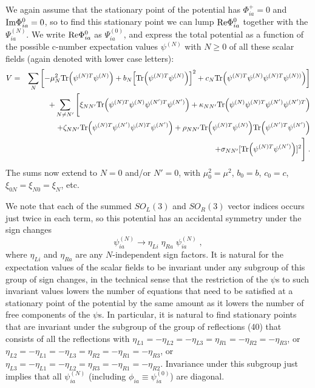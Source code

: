 We again assume that the stationary point of the potential has $\Phi^+_{ia}=0$ and ${\rm Im}\Phi^0_{ia}=0$, so to find this stationary point we can lump ${\rm Re}\Phi^0_{ia}$ together with the $\Psi^{(N)}_{ia}$.  We write ${\rm Re}\Phi^0_{ia}$ as $\Psi_{ia}^{(0)}$, and express the total potential as a function of the  possible c-number expectation values $\psi^{(N)}$ with $N\geq 0$ of all these  scalar fields (again denoted with lower case letters):
\begin{eqnarray}
V=&&\sum_N\left[-\mu_N^2{\rm Tr}\Big(\psi^{(N)T}\psi^{(N)}\Big)+b_N\Big[{\rm Tr}\Big(\psi^{(N)T}\psi^{(N)}\Big)\Big]^2+c_N{\rm Tr}\Big(\psi^{(N)T}\psi^{(N)}\psi^{(N)T}\psi^{(N))}\Big)\right]\nonumber\\&&
+\sum_{N\neq N'}\Bigg[\xi_{NN'} {\rm Tr}\Big(\psi^{(N)T}\psi^{(N)}\psi^{(N')T}\psi^{(N')}\Big)+\kappa_{N N'}{\rm Tr}\Big(\psi^{(N)}\psi^{(N)T}\psi^{(N')}\psi^{(N')T}\Big)\nonumber\\&&
+\zeta_{N N'} {\rm Tr}\Big(\psi^{(N)T}\psi^{(N')}\psi^{(N)T}\psi^{(N')}\Big)
+\rho_{N N'} {\rm Tr}\Big(\psi^{(N)T}\psi^{(N)}\Big){\rm Tr}\Big(\psi^{(N')T}\psi^{(N')}\Big)\nonumber\\&&+\sigma_{N N'} [{\rm Tr}\Big(\psi^{(N)T}\psi^{(N')}\Big)]^2\Bigg]\;.
\end{eqnarray}
The sums now extend to $N=0$ and/or $N'=0$, with $\mu_0^2=\mu^2$, $b_0=b$, $c_0=c$, $\xi_{0N}=\xi_{N0}=\xi_N$, etc.

We note that each of the summed $SO_L(3)$ and $SO_R(3)$ vector indices occurs just twice in each term, so this potential has an 
accidental symmetry under the sign changes
\begin{equation}
\psi^{(N)}_{ia}\rightarrow \eta_{Li}\;\eta_{Ra}\;\psi^{(N)}_{ia}\;,
\end{equation}
where $\eta_{Li}$ and $\eta_{Ra}$ are any $N$-independent sign factors.  It is natural for the expectation values of the scalar fields to be invariant under any subgroup of this group of sign changes, in the technical sense that the restriction of the $\psi$s to such invariant values lowers the number of equations that need to be satisfied at a stationary point of the potential by the same amount as it lowers the number of free components of the $\psi$s.  In particular, it is natural to find stationary points that are invariant under the subgroup of the group of reflections (40) that consists of all the reflections with $
\eta_{L1}=-\eta_{L2}=-\eta_{L3}=\eta_{R1}=-\eta_{R2}=-\eta_{R3}$, or $\eta_{L2}=-\eta_{L1}=-\eta_{L3}=\eta_{R2}=-\eta_{R1}=-\eta_{R3}$, or $\eta_{L3}=-\eta_{L1}=-\eta_{L2}=\eta_{R3}=-\eta_{R1}=-\eta_{R2}$.  Invariance under this subgroup just implies that all $\psi^{(N)}_{ia}$ (including $\phi_{ia}\equiv \psi_{ia}^{(0)}$) are diagonal.   

